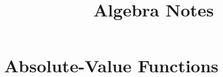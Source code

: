 \documentclass[11pt]{article}
\title{Algebra Notes}
\author{}
\date{}
\begin{document}
\maketitle
\tableofcontents

\section{Absolute-Value Functions}


\end{document}
